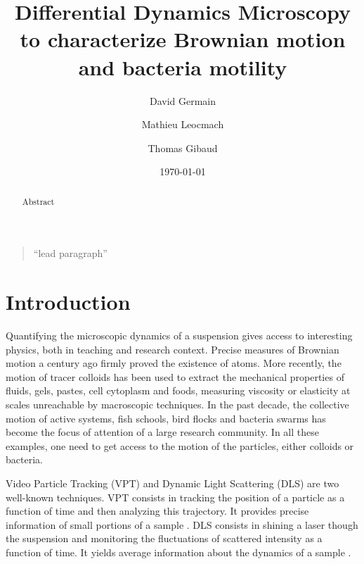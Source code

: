 \documentclass[%
 aip,
 jmp,%
 amsmath,amssymb,
reprint,%
]{revtex4-1}
\begin{document}

\title[Sample title]{Differential Dynamics Microscopy to characterize Brownian motion and bacteria motility}%

\author{David Germain}
\author{Mathieu Leocmach}
\author{Thomas Gibaud}

\date{\today}%

\begin{abstract}
Abstract
\end{abstract}

\maketitle

\begin{quotation}
``lead paragraph''
\end{quotation}

\section{\label{sec:level1}Introduction}

Quantifying the microscopic dynamics of a suspension gives access to interesting physics, both in teaching and research context. Precise measures of Brownian motion a century ago firmly proved the existence of atoms. More recently, the motion of tracer colloids has been used to extract the mechanical properties of fluids, gels, pastes, cell cytoplasm and foods, measuring viscosity or elasticity at scales unreachable by macroscopic techniques. In the past decade, the collective motion of active systems, fish schools, bird flocks and bacteria swarms has become the focus of attention of a large research community. In all these examples, one need to get access to the motion of the particles, either colloids or bacteria.

Video Particle Tracking (VPT) and Dynamic Light Scattering (DLS) are two well-known techniques. VPT consists in tracking the position of a particle as a function of time and then analyzing this trajectory. It provides precise information of small portions of a sample \citep{7_jaqaman2008robust}. DLS consists in shining a laser though the suspension and monitoring the fluctuations of scattered intensity as a function of time. It yields average information about the dynamics of a sample \citep{18_sartor2003dynamic}.
\end{document}
